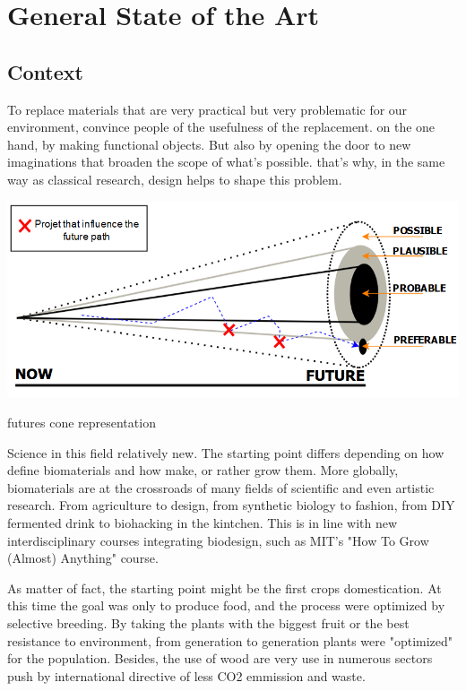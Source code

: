 \chapter{General State of the Art}


\section{Context}

To replace materials that are very practical but very problematic for our environment, convince people of the usefulness of the replacement. on the one hand, by making functional objects. But also by opening the door to new imaginations that broaden the scope of what's possible. that's why, in the same way as classical research, design helps to shape this problem. 
\begin{marginfigure}[-5cm] %
    \centering
    \includegraphics[width=\linewidth]{images/futures_cone2.png}
    \caption{futures cone representation}
    \label{fig:futures code}
\end{marginfigure}
Science in this field relatively new. The starting point differs depending on how define biomaterials and how make, or rather grow them. 
More globally, biomaterials are at the crossroads of many fields of scientific and even artistic research. From agriculture to design, from synthetic biology to fashion, from DIY fermented drink to biohacking in the kintchen\cite{CiteTheOdin}.
This is in line with new interdisciplinary courses integrating biodesign, such as MIT's "How To Grow (Almost) Anything" course\cite{CiteMITHTGAA}. 

As matter of fact, the starting point might be the first crops domestication. At this time the goal was only to produce food, and the process were optimized by selective breeding. By taking the plants with the biggest fruit or the best resistance to environment, from generation to generation plants were "optimized" for the population.
Besides, the use of wood are very use in numerous sectors\cite{ramage2017wood} push by international directive of less CO2 emmission and waste. 
  
